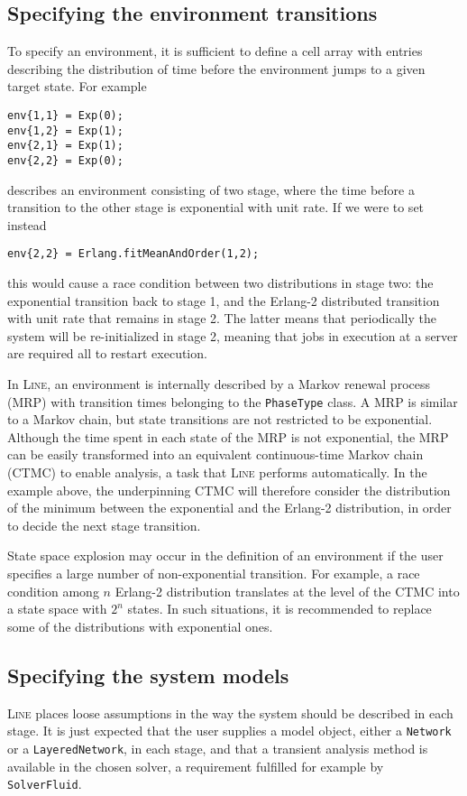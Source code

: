 \subsection{Specifying the environment transitions}
To specify an environment, it is sufficient to define a cell array with entries describing the distribution of time before the environment jumps to a given target state. For example
\begin{lstlisting}
env{1,1} = Exp(0);
env{1,2} = Exp(1);
env{2,1} = Exp(1);
env{2,2} = Exp(0);
\end{lstlisting}
describes an environment consisting of two stage, where the time before a transition to the other stage is exponential with unit rate. If we were to set instead
\begin{lstlisting}
env{2,2} = Erlang.fitMeanAndOrder(1,2);
\end{lstlisting}
this would cause a race condition between two distributions in stage two: the exponential transition back to stage 1, and the Erlang-2 distributed transition with unit rate that remains in stage 2. The latter means that periodically the system will be re-initialized in stage 2, meaning that jobs in execution at a server are required all to restart execution.

In \textsc{Line}, an environment is internally described by a Markov renewal process (MRP) with transition times belonging to the \texttt{PhaseType} class. A MRP is similar to a Markov chain, but state transitions are not restricted to be exponential. Although the time spent in each state of the MRP is not exponential, the MRP can be easily transformed into an equivalent continuous-time Markov chain (CTMC) to enable analysis, a task that \textsc{Line} performs automatically. In the example above, the underpinning CTMC will therefore consider the distribution of the minimum between the exponential and the Erlang-2 distribution, in order to decide the next stage transition.

State space explosion may occur in the definition of an environment if the user specifies a large number of non-exponential transition. For example, a race condition among $n$ Erlang-2 distribution translates at the level of the CTMC into a state space with $2^n$ states. In such situations, it is recommended to replace some of the distributions with exponential ones.

\subsection{Specifying the system models}
\textsc{Line} places loose assumptions in the way the system should be described in each stage. It is just expected that the user supplies a model object, either a \texttt{Network} or a \texttt{LayeredNetwork}, in each stage, and that a transient analysis method is available in the chosen solver, a requirement fulfilled for example by \texttt{SolverFluid}.

